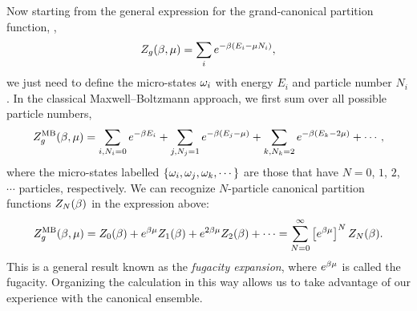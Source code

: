 Now starting from the general expression for the grand-canonical partition function, ,
\begin{equation*}
  Z_g(\beta, \mu) = \sum_i e^{-\beta (E_i - \mu N_i)},
\end{equation*}
we just need to define the micro-states $\omega_i$ with energy $E_i$ and particle number $N_i$.
In the classical Maxwell--Boltzmann approach, we first sum over all possible particle numbers,
\begin{equation*}
  Z_g^{\text{MB}}(\beta, \mu) = \sum_{i, N_i = 0} e^{-\beta E_i} + \sum_{j, N_j = 1} e^{-\beta (E_j - \mu)} + \sum_{k, N_k = 2} e^{-\beta (E_k - 2\mu)} + \cdots,
\end{equation*}
where the micro-states labelled $\left\{\omega_i, \omega_j, \omega_k, \cdots\right\}$ are those that have $N = 0$, $1$, $2$, $\cdots$ particles, respectively.
We can recognize $N$-particle canonical partition functions $Z_N(\beta)$ in the expression above:
\begin{equation}
  \label{eq:fugacity_exp}
  Z_g^{\text{MB}}(\beta, \mu) = Z_0(\beta) + e^{\beta\mu} Z_1(\beta) + e^{2\beta\mu} Z_2(\beta) + \cdots = \sum_{N = 0}^{\infty} \left[e^{\beta\mu}\right]^N Z_N(\beta).
\end{equation}
This is a general result known as the \textit{fugacity expansion}, where $e^{\beta\mu}$ is called the fugacity.
Organizing the calculation in this way allows us to take advantage of our experience with the canonical ensemble.


